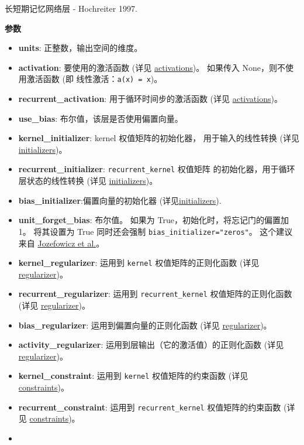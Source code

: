 长短期记忆网络层 - Hochreiter 1997.

\textbf{参数}

\begin{itemize}
\tightlist
\item
  \textbf{units}: 正整数，输出空间的维度。
\item
  \textbf{activation}: 要使用的激活函数 (详见
  \hyperref[activations]{activations})。 如果传入
  None，则不使用激活函数 (即 线性激活：\texttt{a(x)\ =\ x})。
\item
  \textbf{recurrent\_activation}: 用于循环时间步的激活函数 (详见
  \hyperref[activations]{activations})。
\item
  \textbf{use\_bias}: 布尔值，该层是否使用偏置向量。
\item
  \textbf{kernel\_initializer}: kernel 权值矩阵的初始化器，
  用于输入的线性转换 (详见 \hyperref[initializers]{initializers})。
\item
  \textbf{recurrent\_initializer}: \texttt{recurrent\_kernel} 权值矩阵
  的初始化器，用于循环层状态的线性转换 (详见
  \hyperref[initializers]{initializers})。
\item
  \textbf{bias\_initializer}:偏置向量的初始化器
  (详见\hyperref[initializers]{initializers}).
\item
  \textbf{unit\_forget\_bias}: 布尔值。 如果为
  True，初始化时，将忘记门的偏置加 1。 将其设置为 True 同时还会强制
  \texttt{bias\_initializer="zeros"}。 这个建议来自
  \href{http://www.jmlr.org/proceedings/papers/v37/jozefowicz15.pdf}{Jozefowicz
  et al.}。
\item
  \textbf{kernel\_regularizer}: 运用到 \texttt{kernel}
  权值矩阵的正则化函数 (详见 \hyperref[regularizers]{regularizer})。
\item
  \textbf{recurrent\_regularizer}: 运用到 \texttt{recurrent\_kernel}
  权值矩阵的正则化函数 (详见 \hyperref[regularizers]{regularizer})。
\item
  \textbf{bias\_regularizer}: 运用到偏置向量的正则化函数 (详见
  \hyperref[regularizers]{regularizer})。
\item
  \textbf{activity\_regularizer}: 运用到层输出（它的激活值）的正则化函数
  (详见 \hyperref[regularizers]{regularizer})。
\item
  \textbf{kernel\_constraint}: 运用到 \texttt{kernel} 权值矩阵的约束函数
  (详见 \hyperref[constraints]{constraints})。
\item
  \textbf{recurrent\_constraint}: 运用到 \texttt{recurrent\_kernel}
  权值矩阵的约束函数 (详见 \hyperref[constraints]{constraints})。
\item

\end{itemize}
